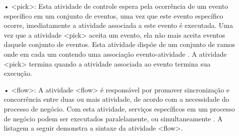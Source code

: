 \begin{itemize}

\item[•] <pick>: Esta atividade de controle espera pela ocorrência de um evento específico em um conjunto de eventos, uma vez que este evento específico ocorre, imediatamente a atividade associada a este evento é executada. Uma vez que a atividade <pick> aceita um evento, ela não mais aceita eventos daquele conjunto de eventos. Esta atividade dispõe de um conjunto de ramos onde em cada um contendo uma associação evento-atividade \cite{BPEL20}. A atividade <pick> termina quando a atividade associada ao evento termina sua execução. 

%

%

\item[•] <flow>: A atividade <flow> é responsável por promover sincronização e concorrência entre duas ou mais atividade, de acordo com a necessidade do processo de negócio. Com esta atividade, serviços específicos em um processo de negócio podem ser executados paralelamente, ou simultaneamente \cite{BPEL20}. A listagem a seguir demonstra a sintaxe da atividade <flow>.

%  

\end{itemize}

